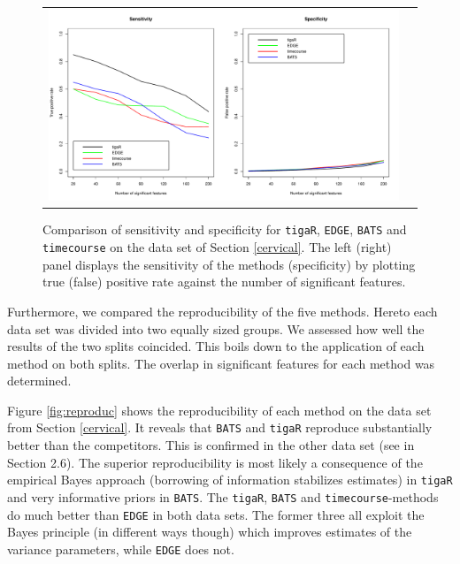 \begin{figure}[h!]
\centering
\begin{tabular}{cc}   
\includegraphics[scale=0.4]{Figure9.pdf}
\end{tabular}
\caption{Comparison of sensitivity and specificity for {\tt tigaR}, {\tt EDGE}, {\tt BATS} and 
{\tt timecourse} on the data set of Section \ref{cervical}. The left (right) panel displays the
 sensitivity of the methods (specificity) by plotting true (false) positive rate
 against the number of significant features.}
\label{fig:sens&spec}
\end{figure}

Furthermore, we compared the reproducibility of the five methods. Hereto each data set was divided into two equally sized groups. We assessed how well the results of the two splits coincided. This boils down to the application of each method on both splits. The overlap in significant features for each method was determined.

Figure \ref{fig:reproduc} shows the reproducibility of each method on the data set from Section \ref{cervical}. It reveals that {\tt BATS} and {\tt tigaR} reproduce substantially better than the competitors. This is confirmed in the other data set (see in \cite{Supp2018} Section 2.6). The superior reproducibility is most likely a consequence of the empirical Bayes approach (borrowing of information stabilizes estimates) in {\tt tigaR} and very informative priors in {\tt BATS}. The {\tt tigaR}, {\tt BATS} and {\tt timecourse}-methods do much better than {\tt EDGE} in both data sets. The former three all exploit the Bayes principle (in different ways though) which  improves estimates of the variance parameters, while {\tt EDGE} does not.


